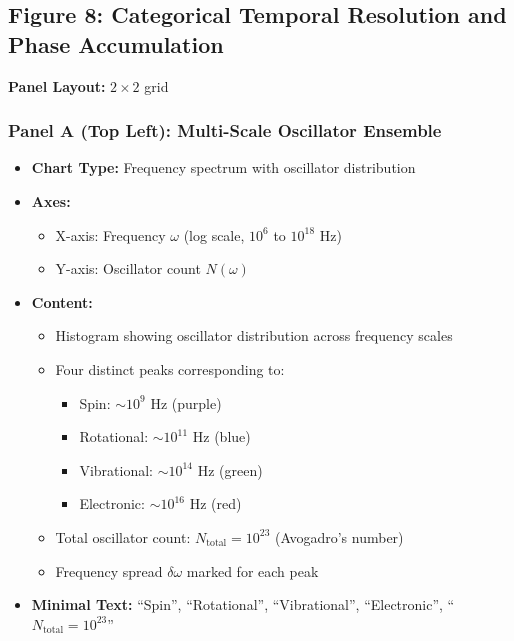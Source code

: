
\subsection*{Figure 8: Categorical Temporal Resolution and Phase Accumulation}

\textbf{Panel Layout:} $2 \times 2$ grid

\subsubsection*{Panel A (Top Left): Multi-Scale Oscillator Ensemble}
\begin{itemize}
\item \textbf{Chart Type:} Frequency spectrum with oscillator distribution
\item \textbf{Axes:}
  \begin{itemize}
  \item X-axis: Frequency $\omega$ (log scale, $10^6$ to $10^{18}$ Hz)
  \item Y-axis: Oscillator count $N(\omega)$
  \end{itemize}
\item \textbf{Content:}
  \begin{itemize}
  \item Histogram showing oscillator distribution across frequency scales
  \item Four distinct peaks corresponding to:
    \begin{itemize}
    \item Spin: $\sim 10^9$ Hz (purple)
    \item Rotational: $\sim 10^{11}$ Hz (blue)
    \item Vibrational: $\sim 10^{14}$ Hz (green)
    \item Electronic: $\sim 10^{16}$ Hz (red)
    \end{itemize}
  \item Total oscillator count: $N_{\text{total}} = 10^{23}$ (Avogadro's number)
  \item Frequency spread $\delta\omega$ marked for each peak
  \end{itemize}
\item \textbf{Minimal Text:} ``Spin'', ``Rotational'', ``Vibrational'', ``Electronic'', ``$N_{\text{total}} = 10^{23}$''
\end{itemize}

